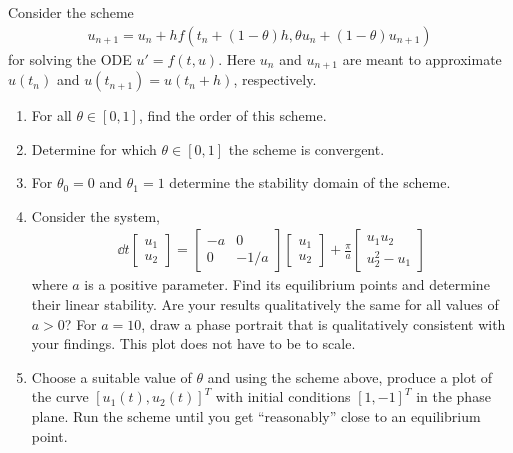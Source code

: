 \documentclass[10pt]{article}
\begin{document}
\begin{problem}
Consider the scheme
\begin{align*}
    u_{n+1} = u_n + hf(t_n+(1-\theta)h,\theta u_n+(1-\theta)u_{n+1})
\end{align*}
for solving the ODE \( u' = f(t,u) \). Here \( u_n \) and \( u_{n+1} \) are meant to approximate \( u(t_n) \) and \( u(t_{n+1}) = u(t_n+h) \), respectively.
\begin{enumerate}[label=(\alph*),nolistsep]
    \item For all \( \theta \in [0,1] \), find the order of this scheme.
    \item Determine for which \( \theta\in[0,1] \) the scheme is convergent.
    \item For \( \theta_0 = 0 \) and \( \theta_1 = 1 \) determine the stability domain of the scheme.
    \item Consider the system,
    \begin{align*}
        \dd{}{t} \left[\begin{array}{c}u_1 \\ u_2\end{array}\right]
        =
        \left[\begin{array}{cc}-a & 0 \\ 0 & -1/a\end{array}\right]
        \left[\begin{array}{c}u_1 \\ u_2\end{array}\right]
        + \frac{\pi}{a} \left[\begin{array}{c}u_1u_2 \\ u_2^2 - u_1 \end{array}\right]
    \end{align*}
    where \( a \) is a positive parameter. Find its equilibrium points and determine their linear stability. Are your results qualitatively the same for all values of \( a > 0 \)? For \( a = 10 \), draw a phase portrait that is qualitatively consistent with your findings. This plot does not have to be to scale.
    \item Choose a suitable value of \( \theta \) and using the scheme above, produce a plot of the curve \( [u_1(t), u_2(t)]^T \) with initial conditions \( [1,-1]^T \) in the phase plane. Run the scheme until you get ``reasonably'' close to an equilibrium point.
\end{enumerate}
\end{problem}
\end{document}
